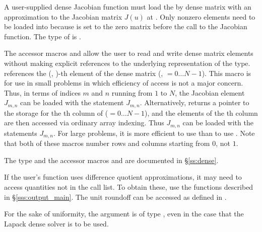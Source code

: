 {
  A user-supplied dense Jacobian function must load the  by 
  dense matrix  with an approximation to the Jacobian matrix $J(u)$ at .
  Only nonzero elements need to be loaded
  into  because  is set to the zero matrix before the call
  to the Jacobian function. The type of  is . 
  
  The accessor macros  and  allow the user to
  read and write dense matrix elements without making explicit
  references to the underlying representation of the 
  type.  references the (, )-th
  element of the dense matrix  (, $= 0\ldots N-1$). This macro
  is for use in small problems in which efficiency of access is not a major
  concern.  Thus, in terms of indices $m$ and $n$ running from $1$ to
  $N$, the Jacobian element $J_{m,n}$ can be loaded with the statement
   $J_{m,n}$.  Alternatively,
   returns a pointer to the storage for
  the th column of  ($= 0\ldots N-1$), and the 
  elements of the th column
  are then accessed via ordinary array indexing.  Thus $J_{m,n}$ can be 
  loaded with the statements 
   $J_{m,n}$.  For large problems, it is more 
  efficient to use  than to use . 
  Note that both of these macros number rows and columns
  starting from $0$, not $1$.  

  The  type and the accessor macros  and 
   are documented in \S\ref{ss:dense}.

  If the user's  function uses difference quotient
  approximations, it may need to access quantities not in the call
  list. To obtain these, use the  functions described in
  \S\ref{sss:output_main}. The unit roundoff can be accessed
  as  defined in .

  For the sake of uniformity, the argument  is of type ,
  even in the case that the Lapack dense solver is to be used.
}


